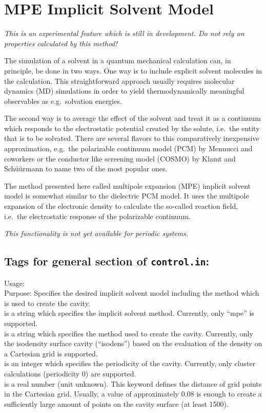 \section{MPE Implicit Solvent Model}

\emph{This is an experimental feature which is still in development. Do not rely on properties calculated by this method!}

The simulation of a solvent in a quantum mechanical calculation can, in principle, be done in two ways. One way is to include explicit solvent molecules in the calculation. This straightforward approach usually requires molecular dynamics (MD) simulations in order to yield thermodynamically meaningful observables as e.g.~solvation energies.

The second way is to average the effect of the solvent and treat it as a continuum which responds to the electrostatic potential created by the solute, i.e.~the entity that is to be solvated. There are several flavors to this comparatively inexpensive approximation, e.g.~the polarizable continuum model (PCM) by Mennucci and coworkers \cite{Mennucci02} or the conductor like screening model (COSMO) by Klamt and Sch\"u\"urmann \cite{Klamt93} to name two of the most popular ones.

The method presented here called multipole expansion (MPE) implicit solvent model is somewhat similar to the dielectric PCM model. It uses the multipole expansion of the electronic density to calculate the so-called reaction field, i.e.~the electrostatic response of the polarizable continuum.


\emph{This functionality is not yet available for periodic systems.}



\subsection*{Tags for general section of \texttt{control.in}:}

{
  \noindent
  Usage:     \\[1.0ex] 
  Purpose: Specifies the desired implicit solvent model including the method which is used to create the cavity. \\[1.0ex]
   is a string which specifies the implicit solvent method. Currently, only ``mpe'' is supported. \\[1.0ex]
   is a string which specifies the method used to create the cavity. Currently, only the isodensity surface cavity (``isodens'') based on the evaluation of the density on a Cartesian grid is supported. \\[1.0ex]
   is an integer which specifies the periodicity of the cavity. Currently, only cluster calculations (periodicity 0) are supported. \\[1.0ex]
   is a real number (unit unknown). This keyword defines the distance of grid points in the Cartesian grid. Usually, a value of approximately $0.08$ is enough to create a sufficiently large amount of points on the cavity surface (at least 1500). \\
}

